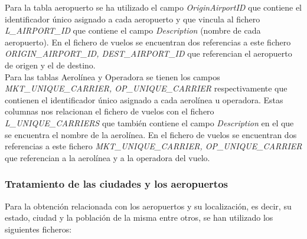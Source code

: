 \documentclass{article}
\begin{document}
Para la tabla aeropuerto se ha utilizado el campo \textit{OriginAirportID} que contiene el identificador único asignado a cada aeropuerto y que vincula al fichero \textit{L\_AIRPORT\_ID} que contiene el campo \textit{Description} (nombre de cada aeropuerto). En el fichero de vuelos se encuentran dos referencias a este fichero \textit{ORIGIN\_AIRPORT\_ID, DEST\_AIRPORT\_ID} que referencian el aeropuerto de origen y el de destino.\\
Para las tablas Aerolínea y Operadora se tienen los campos \textit{ MKT\_UNIQUE\_CARRIER,  OP\_UNIQUE\_CARRIER} respectivamente que contienen el identificador único asignado a cada aerolínea u operadora. Estas columnas nos relacionan el fichero de vuelos con el fichero \textit{L\_UNIQUE\_CARRIERS} que también contiene el campo \textit{Description} en el que se encuentra el nombre de la aerolínea. En el fichero de vuelos se encuentran dos referencias a este fichero \textit{MKT\_UNIQUE\_CARRIER, OP\_UNIQUE\_CARRIER} que referencian a la aerolínea y a la operadora del vuelo.\\


\newpage
\subsubsection{Tratamiento de las ciudades y los aeropuertos}
\label{4.1.2}
Para la obtención relacionada con los aeropuertos y su localización, es decir, su estado, ciudad y la población de la misma entre otros, se han utilizado los siguientes ficheros:
\end{document}
